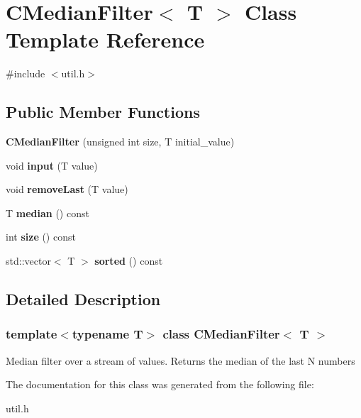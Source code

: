 \hypertarget{class_c_median_filter}{}\section{C\+Median\+Filter$<$ T $>$ Class Template Reference}
\label{class_c_median_filter}


{\ttfamily \#include $<$util.\+h$>$}

\subsection*{Public Member Functions}
\begin{DoxyCompactItemize}
\item 
\mbox{\label{class_c_median_filter_a181463ed081ece10fd437875243d9cad}} 
{\bfseries C\+Median\+Filter} (unsigned int size, T initial\+\_\+value)
\item 
\mbox{\label{class_c_median_filter_ae10cde98866b034ec73c530be4c60874}} 
void {\bfseries input} (T value)
\item 
\mbox{\label{class_c_median_filter_a474dc31733b2fcf70bc7ec06e2887674}} 
void {\bfseries remove\+Last} (T value)
\item 
\mbox{\label{class_c_median_filter_ade078740cdd0555adc2e52468d090c42}} 
T {\bfseries median} () const
\item 
\mbox{\label{class_c_median_filter_a618073c8aa8504670182d40d7084501c}} 
int {\bfseries size} () const
\item 
\mbox{\label{class_c_median_filter_a2ec3e6107c12dc2564f0323d39ecca1e}} 
std\+::vector$<$ T $>$ {\bfseries sorted} () const
\end{DoxyCompactItemize}


\subsection{Detailed Description}
\subsubsection*{template$<$typename T$>$\newline
class C\+Median\+Filter$<$ T $>$}

Median filter over a stream of values. Returns the median of the last N numbers 

The documentation for this class was generated from the following file\+:\begin{DoxyCompactItemize}
\item 
util.\+h\end{DoxyCompactItemize}
